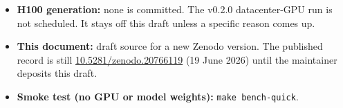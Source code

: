 \documentclass[11pt]{article}
\begin{document}
\begin{itemize}
        random log-probabilities.
  \item \textbf{H100 generation:} none is committed.
        The v0.2.0 datacenter-GPU run is not scheduled.
        It stays off this draft unless a specific reason comes up.
  \item \textbf{This document:} draft source for a new Zenodo version.
        The published record is still
        \href{https://doi.org/10.5281/zenodo.20766119}{10.5281/zenodo.20766119}
        (19 June 2026) until the maintainer deposits this draft.
  \item \textbf{Smoke test (no GPU or model weights):}
        \texttt{make bench-quick}.
\end{itemize}



\end{document}
